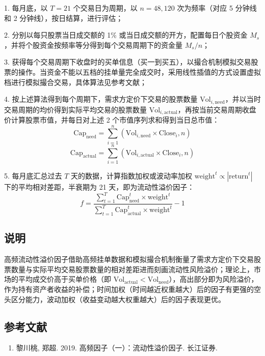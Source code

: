 \documentclass{article}
\begin{document}
1. 每月底，以 \( T=21 \) 个交易日为周期，以 \( n=48,120 \) 次为频率（对应 5 分钟线和 2 分钟线），按日结算，进行评估；

2. 分别以每只股票当日成交额的 1\% 或当日成交额的开方，配置每日个股资金 \( M_s \)，并将个股资金按频率等分得到每个交易周期下的资金量 \( M_s/n \)；

3. 获得每个交易周期下收盘时的买单信息（买一到买五），以撮合机制模拟交易股票的操作。当资金不能以五档的挂单量完全成交时，采用线性插值的方式设置虚拟档进行模拟撮合交易，具体算法见参考文献；

4. 按上述算法得到每个周期下，需求方定价下交易的股票数量 \( \mathrm{Vol}_{i,\mathrm{need}} \)，并以当时交易周期的均价得到实际平均交易的股票数量 \( \mathrm{Vol}_{i,\mathrm{actual}} \)，再按当前交易周期收盘价计算股票市值，并每日对上述 2 个市值序列求和得到当日总市值：
\begin{equation}
    \mathrm{Cap}_{\mathrm{need}} = \sum_{i=1}^{n} (\mathrm{Vol}_{i,\mathrm{need}} \times \mathrm{Close}_i,n)
\end{equation}
\begin{equation}
    \mathrm{Cap}_{\mathrm{actual}} = \sum_{i=1}^{n} (\mathrm{Vol}_{i,\mathrm{actual}} \times \mathrm{Close}_i,n)
\end{equation}

5. 每月底汇总过去 \( T \) 天的数据，计算指数加权或波动率加权 \( \mathrm{weight}^t \propto |\mathrm{return}^t| \) 下的平均相对差距，半衰期为 21 天，即为流动性溢价因子：
\begin{equation}
    f = \frac{\sum_{t=1}^{T} \mathrm{Cap}_{\mathrm{need}}^t \times \mathrm{weight}^t}{\sum_{t=1}^{T} \mathrm{Cap}_{\mathrm{actual}}^t \times \mathrm{weight}^t} - 1
\end{equation}

\subsection{说明}
高频流动性溢价因子借助高频挂单数据和模拟撮合机制衡量了需求方定价下交易股票数量与实际平均交易股票数量的相对差距进而刻画流动性风险溢价；理论上，市场的平均成交价高于买单价格（即 \( \mathrm{Vol}_{\mathrm{actual}} < \mathrm{Vol}_{\mathrm{need}} \)），高出部分即为风险溢价，作为持有资产者收益的补偿；时间加权（时间越近权重越大）后的因子有更强的空头区分能力，波动加权（收益变动越大权重越大）后的因子表现更优。

\subsection{参考文献}
\begin{enumerate}
    \item 黎川桃, 郑超. 2019. 高频因子（一）：流动性溢价因子. 长江证券.
\end{enumerate}
\end{document}
